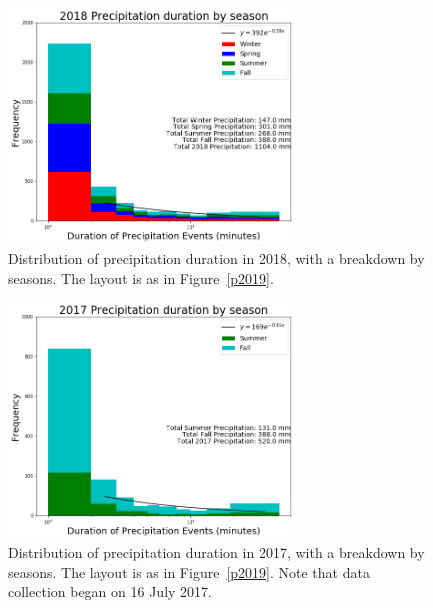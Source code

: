 \documentclass[11pt]{report}
\begin{document}
\clearpage
\begin{figure}[t]
  \centering
  \includegraphics[width=0.675\textwidth]{Figures/precip_2018.png}
  \caption[Precipitation histogram for 2018 broken down by season]{\label{p2018}
    Distribution of precipitation duration in 2018, with a breakdown
    by seasons. The layout is as in Figure~\ref{p2019}.}
\end{figure}

\begin{figure}[b]
  \centering
  \includegraphics[width=0.675\textwidth]{Figures/precip_2017.png}
  \caption[Precipitation histogram for 2017 broken down by
    season]{\label{p2017} Distribution of precipitation duration in
    2017, with a breakdown by seasons. The layout is as in
    Figure~\ref{p2019}. Note that data collection began on 16 July
    2017.}
\end{figure}
\clearpage

\end{document}
